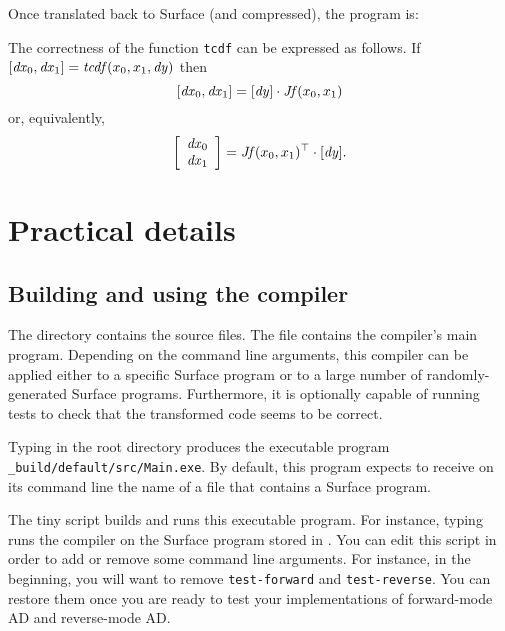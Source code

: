 \documentclass{article}
\begin{document}
\begin{mdframed}[backgroundcolor=gray!10,linewidth=0pt]

\end{mdframed}

Once translated back to Surface (and compressed), the program is:

\begin{mdframed}[backgroundcolor=gray!10,linewidth=0pt]

\end{mdframed}

The correctness of the function \texttt{tcdf} can be expressed as follows.
If
\([\mathit{dx}_0, \mathit{dx}_1] = \mathit{tcdf}(x_0, x_1, \mathit{dy})\)
then
\[
  [\mathit{dx}_0, \mathit{dx}_1] =
  [ \mathit{dy} ] \cdot \mathit{Jf}(x_0, x_1)
\]
or, equivalently,
\[
  \left[\begin{array}{c}\mathit{dx}_0\\\mathit{dx}_1\end{array}\right] = \mathit{Jf}(x_0, x_1)^\top \cdot [ \mathit{dy} ].
\]


\section{Practical details}

\subsection{Building and using the compiler}
\label{sec:testing}

The directory  contains the source files. The file 
contains the compiler's main program. Depending on the command line arguments,
this compiler can be applied either to a specific Surface program or to a
large number of randomly-generated Surface programs. Furthermore, it is
optionally capable of running tests to check that the transformed code seems
to be correct.

Typing  in the root directory produces the executable program
\texttt{\_build/default/src/Main.exe}. By default, this program expects to
receive on its command line the name of a file that contains a Surface
program.

The tiny script  builds and runs this executable program. For
instance, typing  runs the compiler on the
Surface program stored in . You can edit this
script in order to add or remove some command line arguments. For instance, in
the beginning, you will want to remove \texttt{\dash test-forward} and
\texttt{\dash test-reverse}. You can restore them once you are ready to test
your implementations of forward-mode AD and reverse-mode AD.
\end{document}
